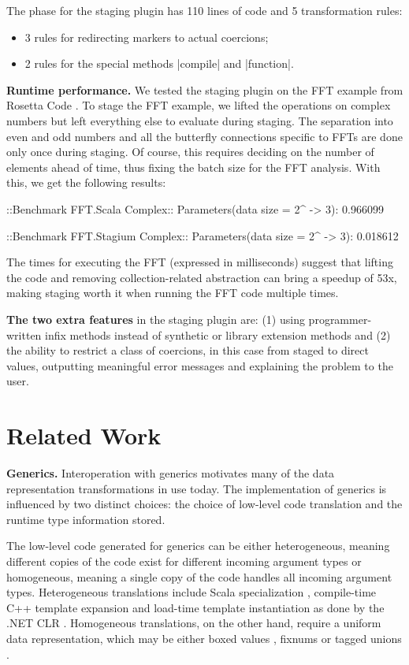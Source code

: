 The \commit{} phase for the staging plugin has 110 lines of code and 5 transformation rules:
\begin{itemize}
\item  3 rules for redirecting markers to actual coercions;
\item  2 rules for the special methods |compile| and |function|.
\end{itemize}

\textbf{Runtime performance.} We tested the staging plugin on the FFT example from Rosetta Code \cite{rosetta-code}. To stage the FFT example, we lifted the operations on complex numbers but left everything else to evaluate during staging. The separation into even and odd numbers and all the butterfly connections specific to FFTs are done only once during staging. Of course, this requires deciding on the number of elements ahead of time, thus fixing the batch size for the FFT analysis. With this, we get the following results:

\begin{lstlisting-nobreak}
 ::Benchmark FFT.Scala Complex::
 Parameters(data size = 2^ -> 3): 0.966099

 ::Benchmark FFT.Stagium Complex::
 Parameters(data size = 2^ -> 3): 0.018612
\end{lstlisting-nobreak}

The times for executing the FFT (expressed in milliseconds) suggest that lifting the code and removing collection-related abstraction can bring a speedup of 53x, making staging worth it when running the FFT code multiple times.

\textbf{The two extra features} in the staging plugin are: (1) using programmer-written infix methods instead of synthetic or library extension methods and (2) the ability to restrict a class of coercions, in this case from staged to direct values, outputting meaningful error messages and explaining the problem to the user.

\section{Related Work}
\label{sec:related}

\textbf{Generics.} Interoperation with generics motivates many of the data representation transformations in use today. The implementation of generics is influenced by two distinct choices: the choice of low-level code translation and the runtime type information stored.

The low-level code generated for generics can be either heterogeneous, meaning different copies of the code exist for different incoming argument types or homogeneous, meaning a single copy of the code handles all incoming argument types. Heterogeneous translations include Scala specialization \cite{iuli-thesis}, compile-time C++ template expansion \cite{cxx-stroustrup} and load-time template instantiation \cite{dot-net-generics} as done by the .NET CLR \cite{ecma-dotnet}. Homogeneous translations, on the other hand, require a uniform data representation, which may be either boxed values \cite{java-erasure, leroy-unboxed-objects}, fixnums \cite{fixnums-lisp} or tagged unions \cite{morrison-napier88}.

